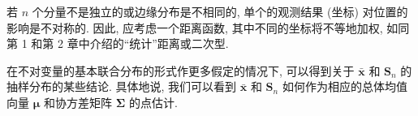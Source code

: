 若 $n$ 个分量不是独立的或边缘分布是不相同的, 单个的观测结果 (坐标) 对位置的影响是不对称的. 因此, 应考虑一个距离函数, 其中不同的坐标将不等地加权, 如同第 1 和第 2 章中介绍的“统计”距离或二次型.

在不对变量的基本联合分布的形式作更多假定的情况下, 可以得到关于 $\bar{\mathbf{x}}$ 和 $\mathbf{S}_{n}$ 的抽样分布的某些结论. 具体地说, 我们可以看到 $\bar{\mathbf{x}}$ 和 $\mathbf{S}_{n}$ 如何作为相应的总体均值向量 $\boldsymbol{\mu}$ 和协方差矩阵 $\boldsymbol{\Sigma}$ 的点估计.
